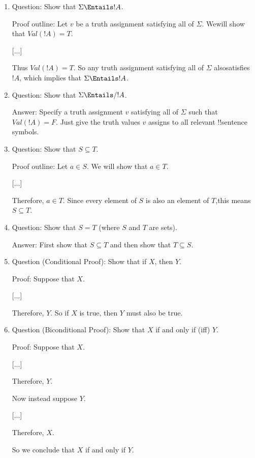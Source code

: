 \documentclass[../../../include/open-logic-section]{subfiles}
\begin{document}

\begin{enumerate}

\item Question: Show that $\Sigma \Entails !A$.

Proof outline: Let $v$ be a truth assignment satisfying all of $\Sigma$. Wewill show that $Val(!A) = T$.

    [...]

Thus $Val(!A) = T$. So any truth assignment satisfying all of $\Sigma$ alsosatisfies $!A$, which implies that $\Sigma \Entails !A$.

\item Question: Show that $\Sigma \Entails/ !A$.

Answer: Specify a truth assignment $v$ satisfying all of $\Sigma$ such that$Val(!A) = F$. Just give the truth values $v$ assigns to all relevant
!!{sentence} symbols.

\item Question: Show that $S \subseteq T$.

Proof outline: Let $a \in S$. We will show that $a \in T$.

[...]

Therefore, $a \in T$. Since every element of $S$ is also an element of $T$,this means $S \subseteq T$.

\item Question: Show that $S = T$ (where $S$ and $T$ are sets).

Answer: First show that $S \subseteq T$ and then show that $T \subseteq S$.
\item Question (Conditional Proof): Show that if $X$, then $Y$.

Proof: Suppose that $X$.

[...]

Therefore, $Y$. So if $X$ is true, then $Y$ must also be true.

\item Question (Biconditional Proof): Show that $X$ if and only if (iff)
$Y$.

Proof: Suppose that $X$.

[...]

Therefore, $Y$.

Now instead suppose $Y$.

[...]

Therefore, $X$.

So we conclude that $X$ if and only if $Y$.


\end{enumerate}
\end{document}
